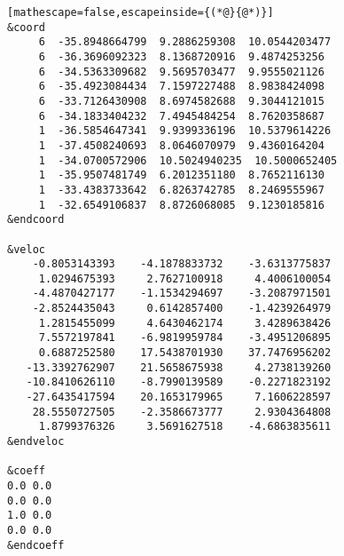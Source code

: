 \begin{lstlisting}[mathescape=false,escapeinside={(*@}{@*)}]
&coord
     6  -35.8948664799  9.2886259308  10.0544203477
     6  -36.3696092323  8.1368720916  9.4874253256
     6  -34.5363309682  9.5695703477  9.9555021126
     6  -35.4923084434  7.1597227488  8.9838424098
     6  -33.7126430908  8.6974582688  9.3044121015
     6  -34.1833404232  7.4945484254  8.7620358687
     1  -36.5854647341  9.9399336196  10.5379614226
     1  -37.4508240693  8.0646070979  9.4360164204
     1  -34.0700572906  10.5024940235  10.5000652405
     1  -35.9507481749  6.2012351180  8.7652116130
     1  -33.4383733642  6.8263742785  8.2469555967
     1  -32.6549106837  8.8726068085  9.1230185816
&endcoord

&veloc
    -0.8053143393    -4.1878833732    -3.6313775837
     1.0294675393     2.7627100918     4.4006100054
    -4.4870427177    -1.1534294697    -3.2087971501
    -2.8524435043     0.6142857400    -1.4239264979
     1.2815455099     4.6430462174     3.4289638426
     7.5572197841    -6.9819959784    -3.4951206895
     0.6887252580    17.5438701930    37.7476956202
   -13.3392762907    21.5658675938     4.2738139260
   -10.8410626110    -8.7990139589    -0.2271823192
   -27.6435417594    20.1653179965     7.1606228597
    28.5550727505    -2.3586673777     2.9304364808
     1.8799376326     3.5691627518    -4.6863835611
&endveloc

&coeff
0.0 0.0
0.0 0.0
1.0 0.0
0.0 0.0
&endcoeff
\end{lstlisting}